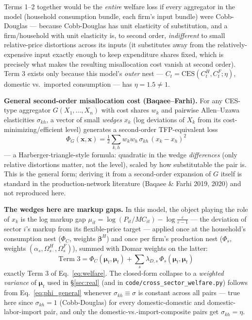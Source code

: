 \documentclass[12pt]{article}
\begin{document}
Terms 1--2 together would be the \emph{entire} welfare loss if every aggregator in the model
(household consumption bundle, each firm's input bundle) were Cobb-Douglas — because Cobb-Douglas
has unit elasticity of substitution, and a firm/household with unit elasticity is, to second order,
\emph{indifferent} to small relative-price distortions across its inputs (it substitutes away from
the relatively-expensive input exactly enough to keep expenditure shares fixed, which is precisely
what makes the resulting misallocation cost vanish at second order). Term 3 exists only because this
model's \emph{outer} nest — $C_t=\mathrm{CES}(C_t^H,C_t^F;\eta)$, domestic vs.\ imported consumption
— has $\eta=1.5\neq1$.

\textbf{General second-order misallocation cost (Baqaee--Farhi).} For any CES-type aggregator
$G(X_1,\ldots,X_n)$ with cost shares $w_k$ and pairwise Allen--Uzawa elasticities $\sigma_{kh}$, a
vector of small \emph{wedges} $x_k$ (log deviations of $X_k$ from its cost-minimizing/efficient
level) generates a second-order TFP-equivalent loss
\begin{equation}
    \Phi_G(\bm{x},\bm{x}) = \tfrac{1}{2}\sum_{k,h} w_k w_h\,\sigma_{kh}\,(x_k-x_h)^2
    \label{eq:phi_general}
\end{equation}
— a Harberger-triangle-style formula: quadratic in the wedge \emph{differences} (only relative
distortions matter, not the level), scaled by how substitutable the pair is. This is the general
form; deriving it from a second-order expansion of $G$ itself is standard in the
production-network literature (Baqaee \& Farhi 2019, 2020) and not reproduced here.

\textbf{The wedges here are markup gaps.} In this model, the object playing the role of $x_k$ is the
log markup gap $\mu_{it} = \log(P_{it}/MC_{it}) - \log\frac{\varepsilon}{\varepsilon-1}$ — the
deviation of sector $i$'s markup from its flexible-price target — applied once at the household's
consumption nest ($\Phi_C$, weights $\bm\beta^H$) and once per firm's production nest ($\Phi_s$,
weights $(\alpha_s,\Omega^H_{s\cdot},\Omega^F_s)$), summed with Domar weights on the latter:
\begin{equation}
    \text{Term 3} = \Phi_C(\bm\mu_t,\bm\mu_t) + \sum_s \lambda_{D,s}\,\Phi_s(\bm\mu_t,\bm\mu_t)
\end{equation}
exactly Term 3 of Eq.~\eqref{eq:welfare}. The closed-form collapse to a \emph{weighted variance} of
$\bm\mu_t$ used in \S\ref{sec:real} (and in \texttt{code/cross\_sector\_welfare.py}) follows from
Eq.~\eqref{eq:phi_general} whenever $\sigma_{kh}\equiv\sigma$ is constant across all pairs — true
here since $\sigma_{kh}=1$ (Cobb-Douglas) for every domestic-domestic and domestic-labor-import pair,
and only the domestic-vs.-import-composite pairs get $\sigma_{kh}=\eta$.
\end{document}
